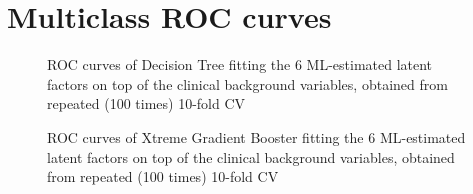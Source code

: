 \documentclass{amsart}
\theoremstyle{plain}
\begin{document}
\section{Multiclass ROC curves}
\begin{figure}
  
  \caption{ROC curves of Decision Tree fitting the 6 ML-estimated latent factors on top of the clinical background variables, obtained from repeated (100 times) 10-fold CV}
  \label{roc:tree}
\end{figure}
\begin{figure}
  
  \caption{ROC curves of Xtreme Gradient Booster fitting the 6 ML-estimated latent factors on top of the clinical background variables, obtained from repeated (100 times) 10-fold CV}
  \label{roc:xgb}
  \end{figure}
\end{document}
